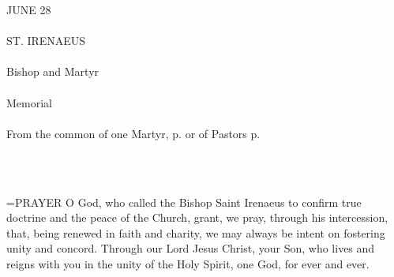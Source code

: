 \begin{center}\normalsize \begin{center}\normalsize JUNE 28\\\\
\footnotesize \footnotesize ST. IRENAEUS\\\\
\footnotesize \footnotesize Bishop and Martyr\\\\
\footnotesize \footnotesize Memorial\\\\
\footnotesize \footnotesize From the common of one Martyr, p.    or of Pastors p. \\\\
\footnotesize \end{center}\\
\end{center}

\hangindent=\parindent \small{PRAYER 
O God, who called the Bishop Saint Irenaeus
to confirm true doctrine and the peace of the Church,
grant, we pray, through his intercession,
that, being renewed in faith and charity,
we may always be intent on fostering unity and concord.
Through our Lord Jesus Christ, your Son,
who lives and reigns with you in the unity of the Holy Spirit,
one God, for ever and ever.\\}
 

